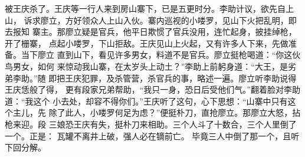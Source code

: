 被王庆杀了。王庆等一行人来到房山寨下，已是五更时分。李助计议，欲先自上山，
诉求廖立，方好领众人上山入伙。寨内巡视的小喽罗，见山下火把乱明，即去报知
寨主。那廖立疑是官兵，他平日欺惯了官兵没用，连忙起身，披挂绰枪，开了栅寨，
点起小喽罗，下山拒敌。王庆见山上火起，又有许多人下来，先做准备。当下廖立
直到山下，看见许多男女，料道不是官兵。廖立挺枪喝道：“你这伙鸟男女，如何
来惊动我山寨，在太岁头上动土？”李助上前躬身道：“大王，是劣弟李助。”随
即把王庆犯罪，及杀管营，杀官兵的事，略述一遍。廖立听李助说得王庆恁般了得，
更有段家兄弟帮助，“我只一身，恐日后受他们气。”翻着脸对李助道：“我这个
小去处，却容不得你们。”王庆听了这句，心下思想：“山寨中只有这个主儿，先
除了此人，小喽罗何足为虑？”便挺朴刀，直抢廖立。那廖立大怒，拈枪来迎。段
三娘恐王庆有失，挺朴刀来相助。三个人斗了十数合，三个人里倒了一个。正是：
瓦罐不离井上破，强人必在镝前亡。
毕竟三人中倒了那一个，且听下回分解。